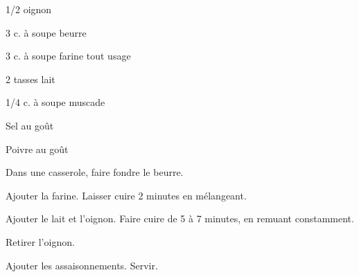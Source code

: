 


\totaltime{}


\begin{ingredients}
    \item 1/2 oignon
    \item 3 c. à soupe beurre
    \item 3 c. à soupe farine tout usage
    \item 2 tasses lait
    \item 1/4 c. à soupe muscade
    \item Sel au goût
    \item Poivre au goût
\end{ingredients}

\begin{steps}
    \item Dans une casserole, faire fondre le beurre.
    \item Ajouter la farine. Laisser cuire 2 minutes en mélangeant.
    \item Ajouter le lait et l'oignon. Faire cuire de 5 à 7 minutes, en remuant constamment.
    \item Retirer l'oignon.
    \item Ajouter les assaisonnements. Servir.
\end{steps}
